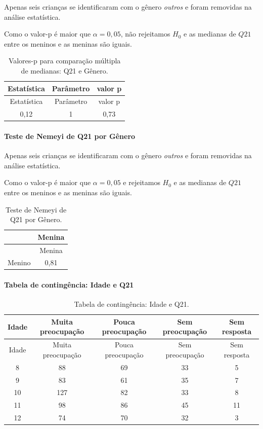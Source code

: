 \documentclass[]{article}
\let\oldparagraph\paragraph
\renewcommand{\paragraph}[1]{\oldparagraph{#1}\mbox{}}
\begin{document}
Apenas seis crianças se identificaram com o gênero \emph{outros} e foram removidas na análise estatística.

Como o valor-p é maior que \(\alpha=0,05\), não rejeitamos \(H_0\) e as medianas de \(Q21\) entre os meninos e as meninas são iguais.

\begin{longtable}[]{@{}ccc@{}}
\caption{\label{tab:unnamed-chunk-338}Valores-p para comparação múltipla de medianas: Q21 e Gênero.}\tabularnewline
\toprule
Estatística & Parâmetro & valor p\tabularnewline
\midrule
\endfirsthead
\toprule
Estatística & Parâmetro & valor p\tabularnewline
\midrule
\endhead
0,12 & 1 & 0,73\tabularnewline
\bottomrule
\end{longtable}

\hypertarget{teste-de-nemeyi-de-q21-por-guxeanero}{%
\paragraph{Teste de Nemeyi de Q21 por Gênero}\label{teste-de-nemeyi-de-q21-por-guxeanero}}

Apenas seis crianças se identificaram com o gênero \emph{outros} e foram removidas na análise estatística.

Como o valor-p é maior que \(\alpha=0,05\) e rejeitamos \(H_0\) e as medianas de \(Q21\) entre os meninos e as meninas são iguais.

\begin{longtable}[]{@{}lc@{}}
\caption{\label{tab:unnamed-chunk-339}Teste de Nemeyi de Q21 por Gênero.}\tabularnewline
\toprule
& Menina\tabularnewline
\midrule
\endfirsthead
\toprule
& Menina\tabularnewline
\midrule
\endhead
Menino & 0,81\tabularnewline
\bottomrule
\end{longtable}

\cleardoublepage

\hypertarget{tabela-de-continguxeancia-idade-e-q21}{%
\paragraph{Tabela de contingência: Idade e Q21}\label{tabela-de-continguxeancia-idade-e-q21}}

\begin{longtable}[]{@{}ccccc@{}}
\caption{\label{tab:unnamed-chunk-340}Tabela de contingência: Idade e Q21.}\tabularnewline
\toprule
Idade & Muita preocupação & Pouca preocupação & Sem preocupação & Sem resposta\tabularnewline
\midrule
\endfirsthead
\toprule
Idade & Muita preocupação & Pouca preocupação & Sem preocupação & Sem resposta\tabularnewline
\midrule
\endhead
8 & 88 & 69 & 33 & 5\tabularnewline
9 & 83 & 61 & 35 & 7\tabularnewline
10 & 127 & 82 & 33 & 8\tabularnewline
11 & 98 & 86 & 45 & 11\tabularnewline
12 & 74 & 70 & 32 & 3\tabularnewline
\bottomrule
\end{longtable}
\end{document}
